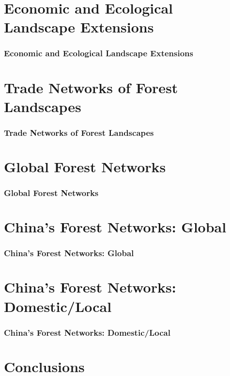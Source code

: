 \documentclass[aspectratio=169]{beamer}
\begin{document}
\section{Economic and Ecological Landscape Extensions}

\begin{frame}
  \frametitle{Economic and Ecological Landscape Extensions}
\end{frame}



\section{Trade Networks of Forest Landscapes}

\begin{frame}
  \frametitle{Trade Networks of Forest Landscapes}
\end{frame}



\section{Global Forest Networks}

\begin{frame}
  \frametitle{Global Forest Networks}
\end{frame}


\section{China's Forest Networks: Global}

\begin{frame}
  \frametitle{China's Forest Networks: Global}
\end{frame}


\section{China's Forest Networks: Domestic/Local}

\begin{frame}
  \frametitle{China's Forest Networks: Domestic/Local}
\end{frame}


\section{Conclusions}
\end{document}
